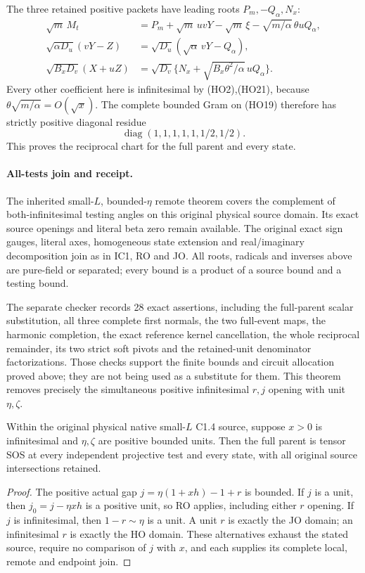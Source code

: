 The three retained positive packets have leading roots
$P_m,-Q_\alpha,N_x$:
\[
 \begin{aligned}
 \sqrt m\,M_t&=P_m+\sqrt m\,uvY-\sqrt m\,\xi
                  -\sqrt{m/\alpha}\,\theta uQ_\alpha,\\
 \sqrt{\alpha D_u}(vY-Z)
             &=\sqrt{D_u}(\sqrt\alpha\,vY-Q_\alpha),\\
 \sqrt{B_xD_v}(X+uZ)
             &=\sqrt{D_v}\{N_x+
                      \sqrt{B_x\theta^2/\alpha}\,uQ_\alpha\}.
 \end{aligned}
 \tag{HO23}
\]
Every other coefficient here is infinitesimal by (HO2),(HO21),
because $\theta\sqrt{m/\alpha}=O(\sqrt x)$.
The complete bounded Gram on (HO19) therefore has strictly positive
diagonal residue
\[
             \operatorname{diag}(1,1,1,1,1,1/2,1/2).
 \tag{HO24}
\]
This proves the reciprocal chart for the full parent and every state.

\paragraph{All-tests join and receipt.}
The inherited small-$L$, bounded-$\eta$ remote theorem covers the
complement of both-infinitesimal testing angles on this original
physical source domain. Its exact source openings and literal beta
zero remain available. The original exact sign gauges, literal axes,
homogeneous state extension and real/imaginary decomposition join
as in IC1, RO and JO. All roots, radicals and inverses above are
pure-field or separated; every bound is a product of a source bound
and a testing bound.

The separate checker records 28 exact assertions, including the
full-parent scalar substitution, all three complete first normals,
the two full-event maps, the harmonic completion, the exact reference
kernel cancellation, the whole reciprocal remainder, its two strict
soft pivots and the retained-unit denominator factorizations.
Those checks support the finite bounds and circuit allocation proved
above; they are not being used as a substitute for them.
This theorem removes precisely the simultaneous positive
infinitesimal $r,j$ opening with unit $\eta,\zeta$.

\begin{corollary}
Within the original physical native small-$L$ C1.4 source, suppose
$x>0$ is infinitesimal and $\eta,\zeta$ are positive bounded units.
Then the full parent is tensor SOS at every independent projective
test and every state, with all original source intersections retained.
\end{corollary}
\begin{proof}
The positive actual gap $j=\eta(1+xh)-1+r$ is bounded.
If $j$ is a unit, then $j_0=j-\eta xh$ is a positive unit,
so RO applies, including either $r$ opening. If $j$ is infinitesimal,
then $1-r\sim\eta$ is a unit. A unit $r$ is exactly the JO domain;
an infinitesimal $r$ is exactly the HO domain. These alternatives
exhaust the stated source, require no comparison of $j$ with $x$,
and each supplies its complete local, remote and endpoint join.
\end{proof}
